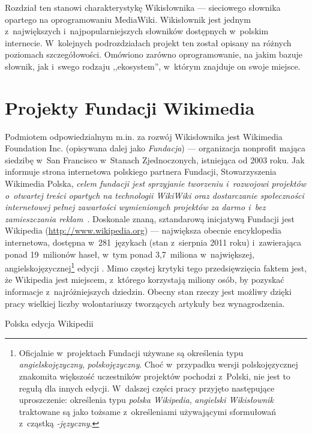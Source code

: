 \label{chap:wikt}
Rozdział ten stanowi charakterystykę Wikisłownika --- sieciowego słownika opartego na oprogramowaniu MediaWiki. Wikisłownik jest jednym z~największych i~najpopularniejszych słowników dostępnych w~polskim internecie. W~kolejnych podrozdziałach projekt ten został opisany na różnych poziomach szczegółowości. Omówiono zarówno oprogramowanie, na jakim bazuje słownik, jak i~swego rodzaju ,,ekosystem'', w~którym znajduje on swoje miejsce.

\section{Projekty Fundacji Wikimedia}
Podmiotem odpowiedzialnym m.in. za rozwój Wikisłownika jest Wikimedia Foundation Inc. (opisywana dalej jako \emph{Fundacja}) --- organizacja non\dywiz{}profit mająca siedzibę w~San Francisco w~Stanach Zjednoczonych, istniejąca od 2003 roku. Jak informuje strona internetowa polskiego partnera Fundacji, Stowarzyszenia Wikimedia Polska, \emph{celem fundacji jest sprzyjanie tworzeniu i~rozwojowi projektów o~otwartej treści opartych na technologii WikiWiki oraz dostarczanie społeczności internetowej pełnej zawartości wymienionych projektów za darmo i~bez zamieszczania reklam}~\cite{wm:pl}. Doskonale znaną, sztandarową inicjatywą Fundacji jest Wikipedia (\url{http://www.wikipedia.org}) --- największa obecnie encyklopedia internetowa, dostępna w~281~językach (stan z~sierpnia 2011 roku) i~zawierająca ponad 19~milionów haseł, w~tym ponad 3,7~miliona w~największej, angielskojęzycznej\footnote{Oficjalnie w~projektach Fundacji używane są określenia typu \emph{angielskojęzyczny}, \emph{polskojęzyczny}. Choć w~przypadku wersji polskojęzycznej znakomita większość uczestników projektów pochodzi z~Polski, nie jest to regułą dla innych edycji. W~dalszej części pracy przyjęto następujące uproszczenie: określenia typu \emph{polska Wikipedia}, \emph{angielski Wikisłownik} traktowane są jako tożsame z~określeniami używającymi sformułowań z~cząstką \emph{-języczny}.} edycji \cite{wiki:list}. Mimo częstej krytyki tego przedsięwzięcia faktem jest, że Wikipedia jest miejscem, z~którego korzystają miliony osób, by pozyskać informacje z~najróżniejszych dziedzin. Obecny stan rzeczy jest możliwy dzięki pracy wielkiej liczby wolontariuszy tworzących artykuły bez wynagrodzenia.

\begin{illustration}
	\caption{Polska edycja Wikipedii}
\end{illustration}

